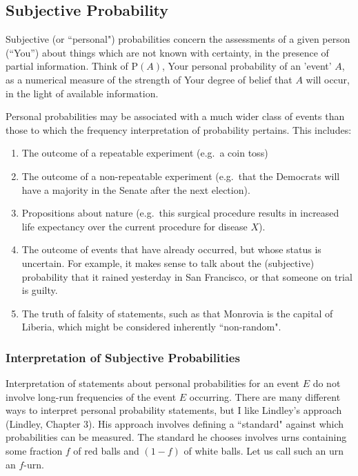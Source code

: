 \documentclass{article}[11pt]
\def\P{\mbox{P}}
\begin{document}
\subsection{Subjective Probability}

Subjective (or ``personal") probabilities concern the assessments of a given person
(``You'') about things which are not known with certainty, in the
presence of partial information.  Think of $\P(A)$, Your personal
probability of an 'event' $A$, as a numerical measure of the strength of
Your degree of belief that $A$ will occur, in the light of available
information.

Personal probabilities may be associated with a much wider class of
events than those to which the frequency interpretation of probability
pertains.  This includes:
\begin{enumerate}
\item The outcome of a repeatable experiment (e.g.\ a coin toss)
\item The outcome of a non-repeatable experiment (e.g.\ that the Democrats will have a majority in the Senate after the next election).
\item Propositions about nature (e.g.\ this surgical procedure results
  in increased life expectancy over the current procedure for disease
 $X$).
\item  The outcome of events that have already occurred, but whose status is uncertain. For example, it makes sense to talk about the (subjective) probability that it rained yesterday in San Francisco, or that someone on trial is guilty. 
\item The truth of falsity of statements, such as that Monrovia is the capital of Liberia, which might be considered inherently ``non-random". 
\end{enumerate}

\subsubsection{Interpretation of Subjective Probabilities}

Interpretation of statements about personal probabilities for an event $E$ do not involve
long-run frequencies of the event $E$ occurring. There are many different
ways to interpret personal probability statements, 
but I like Lindley's approach (Lindley, Chapter 3).
His approach involves defining a ``standard" 
against which probabilities can be measured.
The standard he chooses involves urns containing some fraction $f$ of red balls and $(1-f)$ of white balls. Let us call such an urn an $f$-urn. 
\end{document}
